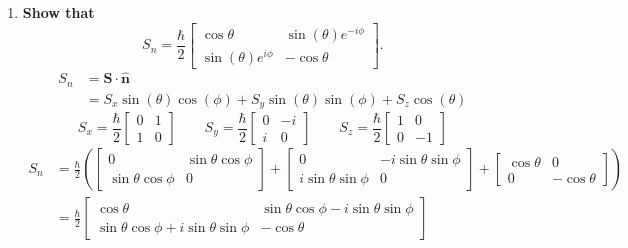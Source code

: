 \documentclass[11pt]{article}
\begin{document}
\begin{enumerate}[label=\textbf{\arabic*.}]
{            \begin{enumerate}[label=\textbf{(\alph*)}]
                \item{
                    \textbf{\boldmath Show that \[S_n=\frac{\hbar}{2}\begin{bmatrix}\cos\theta & \sin(\theta)e^{-i\phi} \\ \sin(\theta)e^{i\phi} & -\cos\theta\end{bmatrix}.\]}
                    \vspace*{-12pt}
                    \begin{align*}
                        S_n&=\mathbf{S}\cdot\mathbf{\hat n} \\
                        &=S_x\sin(\theta)\cos(\phi)+S_y\sin(\theta)\sin(\phi)+S_z\cos(\theta)
                    \end{align*}
                    \begin{equation*}
                        S_x=\frac \hbar 2 \begin{bmatrix}0 & 1 \\ 1 & 0\end{bmatrix}\qquad
                        S_y=\frac \hbar 2 \begin{bmatrix}0 & -i \\ i & 0\end{bmatrix}\qquad
                        S_z=\frac \hbar 2 \begin{bmatrix}1 & 0 \\ 0 & -1\end{bmatrix}
                    \end{equation*}
                    \begin{align*}
                        S_n&=\frac \hbar 2 \left(\begin{bmatrix}0 & \sin\theta\cos\phi \\ \sin\theta\cos\phi & 0\end{bmatrix}+\begin{bmatrix}0 & -i\sin\theta\sin\phi \\ i\sin\theta\sin\phi & 0\end{bmatrix}+\begin{bmatrix}\cos\theta & 0 \\ 0 & -\cos\theta\end{bmatrix}\right) \\
                        &=\frac \hbar 2 \begin{bmatrix}\cos\theta & \sin\theta\cos\phi-i\sin\theta\sin\phi \\ \sin\theta\cos\phi+i\sin\theta\sin\phi & -\cos\theta\end{bmatrix} \\

\end{align*}}
\end{enumerate}}
\end{enumerate}
\end{document}
